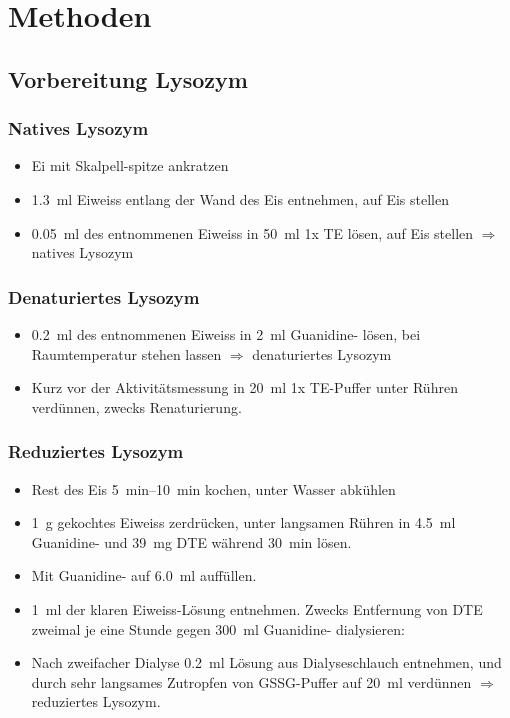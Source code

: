\documentclass[a4paper,german]{scrreprt}
\begin{document}
\chapter{Methoden}

\section{Vorbereitung Lysozym}

\subsection{Natives Lysozym}

\begin{itemize}
	\item Ei mit Skalpell-spitze ankratzen
	\item \SI{1.3}{ml} Eiweiss entlang der Wand des Eis entnehmen, auf Eis stellen
	\item \SI{0.05}{ml} des entnommenen Eiweiss in \SI{50}{ml} 1x TE lösen,
		auf Eis stellen $\Rightarrow$ natives Lysozym
\end{itemize}

\subsection{Denaturiertes Lysozym}

\begin{itemize}
	\item \SI{0.2}{ml} des entnommenen Eiweiss in \SI{2}{ml}
		Guanidine- lösen, bei Raumtemperatur stehen lassen
		$\Rightarrow$ denaturiertes Lysozym
	\item Kurz vor der Aktivitätsmessung in \SI{20}{ml} 1x TE-Puffer unter
		Rühren verdünnen, zwecks Renaturierung.
\end{itemize}

\subsection{Reduziertes Lysozym}

\begin{itemize}
	\item Rest des Eis \SIrange{5}{10}{min} kochen, unter Wasser abkühlen
	\item \SI{1}{g} gekochtes Eiweiss zerdrücken, unter langsamen Rühren in
		\SI{4.5}{ml} Guanidine- und \SI{39}{mg} DTE während
		\SI{30}{min} lösen.
	\item Mit Guanidine- auf \SI{6.0}{ml} auffüllen.
	\item \SI{1}{ml} der klaren Eiweiss-Lösung entnehmen. Zwecks Entfernung
		von DTE zweimal je eine Stunde gegen \SI{300}{ml}
		Guanidine- dialysieren:
	\item Nach zweifacher Dialyse \SI{0.2}{ml} Lösung aus Dialyseschlauch
		entnehmen, und durch sehr langsames Zutropfen von GSSG-Puffer
		auf \SI{20}{ml} verdünnen $\Rightarrow$ reduziertes Lysozym.
\end{itemize}
\end{document}
